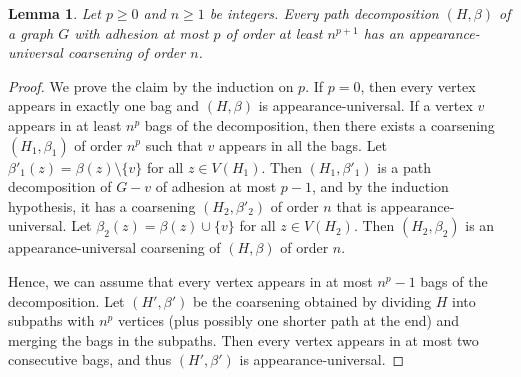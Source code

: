 \documentclass[12pt]{article}
\newtheorem{lemma}[theorem]{Lemma}
\begin{document}
\begin{lemma}\label{lemma-appun}
Let $p\ge 0$ and $n\ge 1$ be integers.  Every path decomposition $(H,\beta)$ of a graph $G$ with adhesion at most $p$ of order at least $n^{p+1}$
has an appearance-universal coarsening of order $n$.
\end{lemma}
\begin{proof}
We prove the claim by the induction on $p$.
If $p=0$, then every vertex appears in exactly one bag and $(H,\beta)$ is appearance-universal.
If a vertex $v$ appears in at least $n^p$ bags of the decomposition, then there exists a coarsening $(H_1,\beta_1)$
of order $n^p$ such that $v$ appears in all the bags.  Let $\beta'_1(z)=\beta(z)\setminus\{v\}$ for all $z\in V(H_1)$.
Then $(H_1,\beta'_1)$ is a path decomposition of $G-v$ of adhesion at most $p-1$, and by the induction hypothesis, it has a coarsening
$(H_2,\beta'_2)$ of order $n$ that is appearance-universal.  Let $\beta_2(z)=\beta(z)\cup\{v\}$ for all $z\in V(H_2)$.  Then $(H_2,\beta_2)$ is an
appearance-universal coarsening of $(H,\beta)$ of order $n$.

Hence, we can assume that every vertex appears in at most $n^p-1$ bags of the decomposition.
Let $(H',\beta')$ be the coarsening obtained by dividing $H$ into subpaths with $n^p$ vertices (plus possibly one shorter
path at the end) and merging the bags in the subpaths.  Then every vertex appears in at most two consecutive bags,
and thus $(H',\beta')$ is appearance-universal.
\end{proof}
\end{document}
